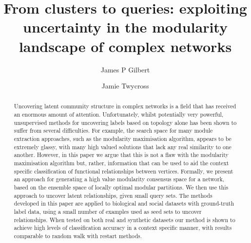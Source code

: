 \documentclass[sigconf]{acmart}
\begin{document}
\title[From clusters to queries]{From clusters to queries: exploiting uncertainty in the modularity landscape of complex networks}

\author{James P Gilbert}

\author{Jamie Twycross}

\begin{abstract}
Uncovering latent community structure in complex networks is a field that has received an enormous amount of attention.
Unfortunately, whilst potentially very powerful, unsupervised methods for uncovering labels based on topology alone has been shown to suffer from several difficulties.
For example, the search space for many module extraction approaches, such as the modularity maximisation algorithm, appears to be extremely glassy, with many high valued solutions that lack any real similarity to one another.
However, in this paper we argue that this is not a flaw with the modularity maximisation algorithm but, rather, information that can be used to aid the context specific classification of functional relationships between vertices.
Formally, we present an approach for generating a high value modularity consensus space for a network, based on the ensemble space of locally optimal modular partitions.
We then use this approach to uncover latent relationships, given small query sets.
The methods developed in this paper are applied to biological and social datasets with ground-truth label data, using a small number of examples used as seed sets to uncover relationships.
When tested on both real and synthetic datasets our method is shown to achieve high levels of classification accuracy in a context specific manner, with results comparable to random walk with restart methods.
\end{abstract}

\maketitle
\end{document}
